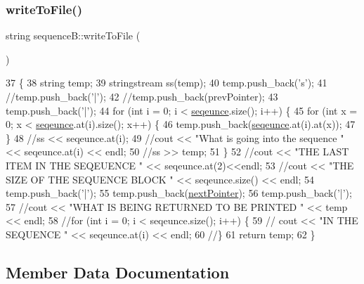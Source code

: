 \subsubsection{\texorpdfstring{write\+To\+File()}{writeToFile()}}
{\footnotesize\ttfamily string sequence\+B\+::write\+To\+File (\begin{DoxyParamCaption}{ }\end{DoxyParamCaption})\hspace{0.3cm}{\ttfamily [inline]}}


\begin{DoxyCode}
37                          \{
38         \textcolor{keywordtype}{string} temp;
39         stringstream ss(temp);
40         temp.push\_back(\textcolor{charliteral}{'s'});
41         \textcolor{comment}{//temp.push\_back('|');}
42         \textcolor{comment}{//temp.push\_back(prevPointer);}
43         temp.push\_back(\textcolor{charliteral}{'|'});
44         \textcolor{keywordflow}{for} (\textcolor{keywordtype}{int} i = 0; i < \mbox{\hyperlink{structsequence_b_a4cb5526b3901d3a3348447bee4e7f623}{seqeunce}}.size(); i++) \{
45             \textcolor{keywordflow}{for} (\textcolor{keywordtype}{int} x = 0; x < \mbox{\hyperlink{structsequence_b_a4cb5526b3901d3a3348447bee4e7f623}{seqeunce}}.at(i).size(); x++) \{
46                 temp.push\_back(\mbox{\hyperlink{structsequence_b_a4cb5526b3901d3a3348447bee4e7f623}{seqeunce}}.at(i).at(x));
47             \}
48             \textcolor{comment}{//ss << seqeunce.at(i);}
49             \textcolor{comment}{//cout << "What is going into the sequence " << seqeunce.at(i) << endl;}
50             \textcolor{comment}{//ss >> temp;}
51         \}
52         \textcolor{comment}{//cout << "THE LAST ITEM IN THE SEQEUENCE " << seqeunce.at(2)<<endl;}
53         \textcolor{comment}{//cout << "THE SIZE OF THE SEQUENCE BLOCK " << seqeunce.size() << endl;}
54         temp.push\_back(\textcolor{charliteral}{'|'});
55         temp.push\_back(\mbox{\hyperlink{structsequence_b_a7fc2afa4a31d852ecaae7d0b6733ad7e}{nextPointer}});
56         temp.push\_back(\textcolor{charliteral}{'|'});
57         \textcolor{comment}{//cout << "WHAT IS BEING RETURNED TO BE PRINTED " << temp << endl;}
58         \textcolor{comment}{//for (int i = 0; i < seqeunce.size(); i++) \{}
59         \textcolor{comment}{//  cout << "IN THE SEQUENCE " << seqeunce.at(i) << endl;}
60         \textcolor{comment}{//\}}
61         \textcolor{keywordflow}{return} temp;
62     \}
\end{DoxyCode}


\subsection{Member Data Documentation}
\mbox{\label{structsequence_b_a7fc2afa4a31d852ecaae7d0b6733ad7e}} 
